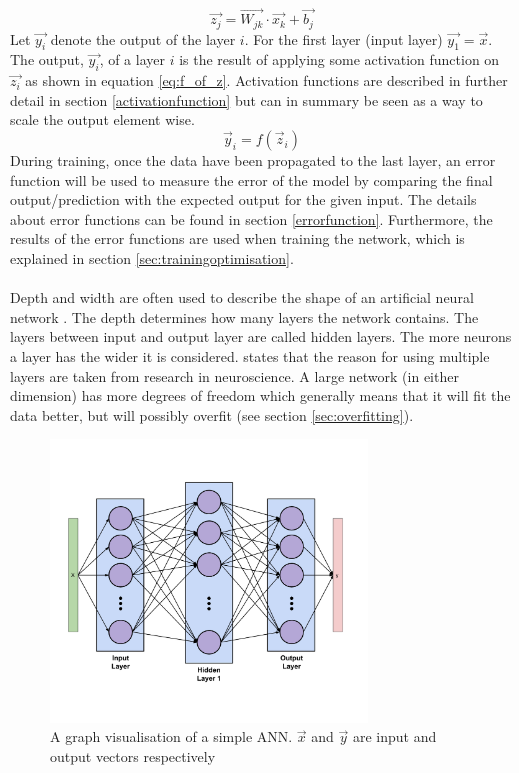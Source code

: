 \begin{equation}\label{eq:z}
    \vec{z_j} = \vec{W_{jk}} \cdot \vec{x_k} + \vec{b_j}
\end{equation}
Let $\vec{y_i}$ denote the output of the layer $i$. For the first layer (input layer) $\vec{y_1}=\vec{x}$. The output, $\vec{y_i}$, of a layer $i$ is the result of applying some activation function on $\vec{z_i}$ as shown in equation \ref{eq:f_of_z}. Activation functions are described in further detail in section \ref{activationfunction} but can in summary be seen as a way to scale the output element wise.
\begin{equation}\label{eq:f_of_z}
    \vec{y}_i = f(\vec{z}_i)
\end{equation}
During training, once the data have been propagated to the last layer, an error function will be used to measure the error of the model by comparing the final output/prediction with the expected output for the given input. The details about error functions can be found in section \ref{errorfunction}. Furthermore, the results of the error functions are used when training the network, which is explained in section \ref{sec:trainingoptimisation}. 
\\\\
Depth and width are often used to describe the shape of an artificial neural network \parencite{Goodfellow-et-al-2016}. The depth determines how many layers the network contains. The layers between input and output layer are called hidden layers. The more neurons a layer has the wider it is considered. \parencite{Goodfellow-et-al-2016} states that the reason for using multiple layers are taken from research in neuroscience. A large network (in either dimension) has more degrees of freedom which generally means that it will fit the data better, but will possibly overfit (see section \ref{sec:overfitting}).

\begin{figure}[h]
    \centering
    \includegraphics[width=0.75\textwidth]{figure/ann/simple_ann}
    \caption{A graph visualisation of a simple ANN. $\vec{x}$ and $\vec{y}$ are input and output vectors respectively}
    \label{fig:simple_ann}
\end{figure}

